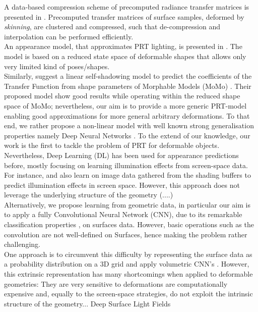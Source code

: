 A data-based compression scheme of precomputed radiance transfer matrices is presented in \cite{SkinningPRT}. Precomputed transfer matrices of surface samples, deformed by \textit{skinning}, are clustered and compressed, such that de-compression and interpolation can be performed efficiently.\\  
An appearance model, that approximates PRT lighting, is presented in  \cite{James_Fatahalian}. The model is based on a reduced state space of deformable shapes that allows only very limited kind of poses/shapes. 
\\
Similarly, \cite{MoMoPRT} suggest a linear self-shadowing model to predict the coefficients of the Transfer Function from shape parameters of Morphable Models (MoMo) \cite{MoMo}. Their proposed model show good results while operating within the reduced shape space of MoMo; nevertheless, our aim is to provide a more generic PRT-model enabling good approximations for more general arbitrary deformations. To that end, we rather propose a non-linear model with well known strong generalisation properties namely Deep Neural Networks \cite{DL_nature}.  To the extend of our knowledge, our work is the first to tackle the problem of PRT for deformable objects. \\ 
Nevertheless, Deep Learning (DL) has been used for appearance predictions before, mostly focusing on learning illumination effects from screen-space data. For instance, \cite{Nalbach2017b} and also \cite{DBLP} learn on image data gathered from the shading buffers to predict illumination effects in screen space. However, this approach does not leverage the underlying structure of the geometry (....) \\
Alternatively, we propose learning from geometric data, in particular our aim is to apply a fully Convolutional Neural Network (CNN), due to its remarkable classification properties \cite{ImageNet_CNN, CNN_videoClassification}, on surfaces data. However, basic operations such as the convolution are not well-defined on Surfaces, hence making the problem rather challenging.\\
One approach is to circumvent this difficulty by representing the surface data as a probability distribution on a  3D grid and apply volumetric CNN's \cite{3d_ShapeNets}. However, this extrinsic representation has many shortcomings when applied to deformable geometries: They are very sensitive to deformations are computationally expensive and, equally to the screen-space strategies, do not exploit the intrinsic structure of the geometry...
%
Deep Surface Light Fields \cite{Deep_Surface_Light_Fields}
%
